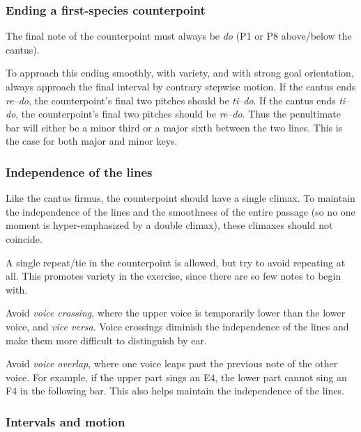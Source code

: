 \documentclass{book}
\begin{document}
\hypertarget{ending-a-first-species-counterpoint}{%
\subsubsection{Ending a first-species
counterpoint}\label{ending-a-first-species-counterpoint}}

The final note of the counterpoint must always be \emph{do} (P1 or P8
above/below the cantus).

To approach this ending smoothly, with variety, and with strong goal
orientation, always approach the final interval by contrary stepwise motion.
If the cantus ends \emph{re}--\emph{do}, the counterpoint's final two pitches
should be \emph{ti}--\emph{do}. If the cantus ends \emph{ti}--\emph{do}, the
counterpoint's final two pitches should be \emph{re}--\emph{do}. Thus the
penultimate bar will either be a minor third or a major sixth between the two
lines. This is the case for both major and minor keys.

\hypertarget{independence-of-the-lines}{%
\subsubsection{Independence of the lines}\label{independence-of-the-lines}}

Like the cantus firmus, the counterpoint should have a single climax. To
maintain the independence of the lines and the smoothness of the entire
passage (so no one moment is hyper-emphasized by a double climax), these
climaxes should not coincide.

A single repeat/tie in the counterpoint is allowed, but try to avoid repeating
at all. This promotes variety in the exercise, since there are so few notes to
begin with.

Avoid \emph{voice crossing}, where the upper voice is temporarily lower than
the lower voice, and \emph{vice versa}. Voice crossings diminish the
independence of the lines and make them more difficult to distinguish by ear.

Avoid \emph{voice overlap}, where one voice leaps past the previous note of
the other voice. For example, if the upper part sings an E4, the lower part
cannot sing an F4 in the following bar. This also helps maintain the
independence of the lines.

\hypertarget{intervals-and-motion}{%
\subsubsection{Intervals and motion}\label{intervals-and-motion}}
\end{document}
